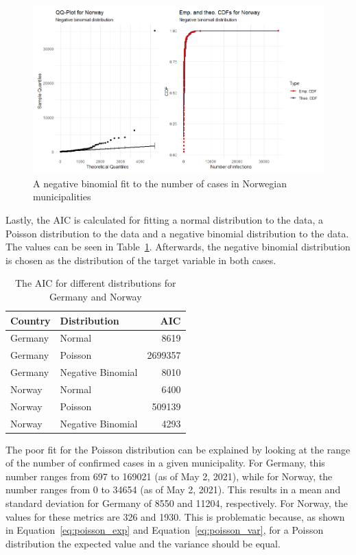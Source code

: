 \clearpage
\begin{figure}[H]
  \centering
  \includegraphics[width = \textwidth]{fit_nbinom_norway.png}
  \caption{A negative binomial fit to the number of cases in Norwegian municipalities}
  \label{fitNegbinomNorway}
\end{figure}
Lastly, the AIC is calculated for fitting a normal distribution to the data, a Poisson distribution to the data and a negative binomial distribution to the data. The values can be seen in Table~\ref{aic}. Afterwards, the negative binomial distribution is chosen as the distribution of the target variable in both cases. \\
\begin{table}[H] 
\caption{The AIC for different distributions for Germany and Norway \label{aic}}
\begin{tabular}{l l r}
\toprule
\textbf{Country}	& \textbf{Distribution}	& \textbf{AIC} \\
\midrule
Germany & Normal & 8619 \\
Germany & Poisson & 2699357 \\
Germany & Negative Binomial & 8010 \\
Norway & Normal & 6400 \\
Norway & Poisson & 509139 \\
Norway & Negative Binomial & 4293 \\
\bottomrule
\end{tabular}
\end{table} 
The poor fit for the Poisson distribution can be explained by looking at the range of the number of confirmed cases in a given municipality. For Germany, this number ranges from 697 to 169021 (as of May 2, 2021), while for Norway, the number ranges from 0 to 34654 (as of May 2, 2021). This results in a mean and standard deviation for Germany of 8550 and 11204, respectively. For Norway, the values for these metrics are 326 and 1930. This is problematic because, as shown in Equation~\ref{eq:poisson_exp} and Equation~\ref{eq:poisson_var}, for a Poisson distribution the expected value and the variance should be equal. \\
